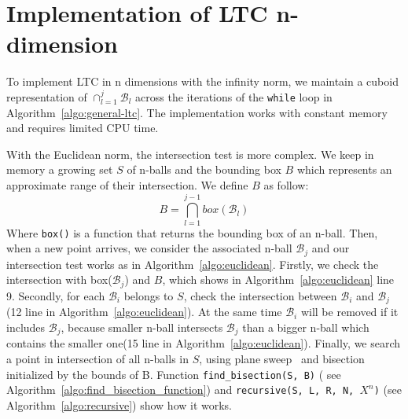 \section{Implementation of LTC n-dimension}

To implement LTC in n dimensions with the infinity norm, we maintain a cuboid
representation of $\cap_{l=1}^j{\mathcal{B}_l}$ across the
iterations of the \texttt{while} loop in
Algorithm~\ref{algo:general-ltc}. The implementation works with
constant memory and requires limited CPU time.

With the Euclidean norm, the intersection test is more complex. We keep in
memory a growing set $S$ of n-balls and the bounding box $B$ which represents an
approximate range of their intersection. We define $B$ as follow:
\begin{equation*}
    B = \bigcap_{l=1}^{j-1} box(\mathcal{B}_l) 
\end{equation*}
Where \texttt{box()} is a function that returns the bounding box of an n-ball.
Then, when a new point arrives, we consider the associated n-ball
$\mathcal{B}_j$ and our intersection test works as in
Algorithm~\ref{algo:euclidean}.  Firstly, we check the intersection with
box($\mathcal{B}_j$) and $B$, which shows in Algorithm~\ref{algo:euclidean} line
9. Secondly, for each $\mathcal{B}_i$ belongs to $S$, check the intersection
between $\mathcal{B}_i$ and $\mathcal{B}_j$ (12 line in
Algorithm~\ref{algo:euclidean}). At the same time $\mathcal{B}_i$ will be
removed if it includes $\mathcal{B}_j$, because smaller n-ball intersects
$\mathcal{B}_j$ than a bigger n-ball which contains the smaller one(15 line in
Algorithm~\ref{algo:euclidean}).  Finally, we search a point in intersection of
all n-balls in $S$, using plane sweep~\cite{shamos1976geometric,
souvaine2008line} and bisection initialized by the bounds of B. Function
\texttt{find\_bisection(S, B)} ( see
Algorithm~\ref{algo:find_bisection_function}) and \texttt{recursive(S, L, R, N,
$X^n$)} (see Algorithm~\ref{algo:recursive}) show how it works. 


